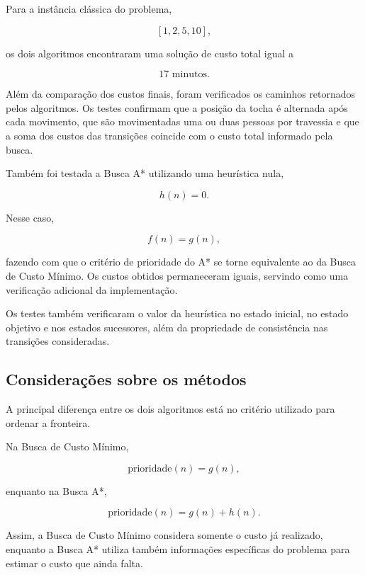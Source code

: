 \documentclass[12pt,a4paper]{article}
\begin{document}
Para a instância clássica do problema,

\[
[1,2,5,10],
\]

os dois algoritmos encontraram uma solução de custo total igual a

\[
17 \text{ minutos}.
\]

Além da comparação dos custos finais, foram verificados os caminhos retornados
pelos algoritmos. Os testes confirmam que a posição da tocha é alternada após
cada movimento, que são movimentadas uma ou duas pessoas por travessia e que a
soma dos custos das transições coincide com o custo total informado pela
busca.

Também foi testada a Busca A* utilizando uma heurística nula,

\[
h(n)=0.
\]

Nesse caso,

\[
f(n)=g(n),
\]

fazendo com que o critério de prioridade do A* se torne equivalente ao da
Busca de Custo Mínimo. Os custos obtidos permaneceram iguais, servindo como
uma verificação adicional da implementação.

Os testes também verificaram o valor da heurística no estado inicial, no estado
objetivo e nos estados sucessores, além da propriedade de consistência nas
transições consideradas.




\subsection{Considerações sobre os métodos}

A principal diferença entre os dois algoritmos está no critério utilizado para
ordenar a fronteira.

Na Busca de Custo Mínimo,

\[
\text{prioridade}(n)=g(n),
\]

enquanto na Busca A*,

\[
\text{prioridade}(n)=g(n)+h(n).
\]

Assim, a Busca de Custo Mínimo considera somente o custo já realizado, enquanto
a Busca A* utiliza também informações específicas do problema para estimar o
custo que ainda falta.
\end{document}
